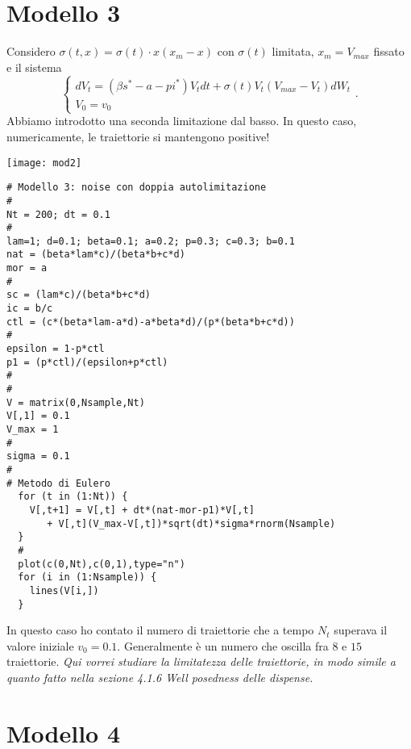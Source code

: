 \documentclass[12pt,a4paper,oneside]{amsart}
\theoremstyle{definition}
\begin{document}
\section{Modello 3}
Considero $\sigma(t,x)=\sigma(t)\cdot x(x_m-x)$ con $\sigma(t)$ limitata, $x_m=V_{max}$ fissato e il sistema $$\begin{cases}
dV_t=\left(\beta s^* -a -p i^*\right)V_tdt + \sigma(t)V_t(V_{max}-V_t)dW_t\\
V_0 = v_0
\end{cases}.$$
Abbiamo introdotto una seconda limitazione dal basso. In questo caso, numericamente, le traiettorie si mantengono positive! 

\begin{center}
\texttt{[image: mod2]}
\end{center}

\begin{center}
\begin{verbatim}
# Modello 3: noise con doppia autolimitazione
#
Nt = 200; dt = 0.1
#
lam=1; d=0.1; beta=0.1; a=0.2; p=0.3; c=0.3; b=0.1
nat = (beta*lam*c)/(beta*b+c*d)
mor = a
#
sc = (lam*c)/(beta*b+c*d)
ic = b/c
ctl = (c*(beta*lam-a*d)-a*beta*d)/(p*(beta*b+c*d))
#
epsilon = 1-p*ctl
p1 = (p*ctl)/(epsilon+p*ctl)
#
#
V = matrix(0,Nsample,Nt)
V[,1] = 0.1
V_max = 1
#
sigma = 0.1 
#
# Metodo di Eulero
  for (t in (1:Nt)) {
    V[,t+1] = V[,t] + dt*(nat-mor-p1)*V[,t] 
       + V[,t](V_max-V[,t])*sqrt(dt)*sigma*rnorm(Nsample)
  }
  #
  plot(c(0,Nt),c(0,1),type="n")
  for (i in (1:Nsample)) {
    lines(V[i,])
  }
\end{verbatim}
\end{center}
In questo caso ho contato il numero di traiettorie che a tempo $N_t$ superava il valore iniziale $v_0=0.1$. Generalmente è un numero che oscilla fra $8$ e $15$ traiettorie.
\emph{Qui vorrei studiare la limitatezza delle traiettorie, in modo simile a quanto fatto nella sezione 4.1.6 Well posedness delle dispense.}

\section*{Modello 4}
\end{document}
